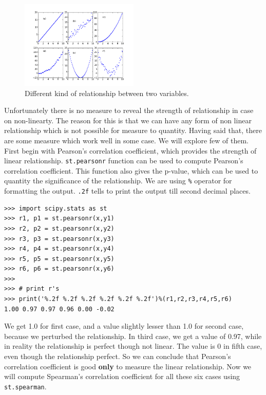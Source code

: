 \documentclass[10pt]{book}
\begin{document}
{\beforefig
\begin{figure}[h!]
  \centering
    \includegraphics[width=0.5\textwidth]{images/corr.png}
  \caption{Different kind of relationship between two variables.}
   \label{fig:corr}
\end{figure}
\afterfig

Unfortunately there is no measure to reveal the strength of relationship in case on non-linearty.  The reason for this is that we can have any form of non linear relationship which is not possible for measure to quantity. Having said that, there are some measure which work well in some case. We will explore few of them. First begin with Pearson's correlation coefficient, which provides the strength of linear relationship. \verb"st.pearsonr" function can be used to compute Pearson's correlation coefficient. This function also gives the p-value, which can be used to quantity the significance of the relationship. We are using \verb"%" 
operator for formatting the output. \verb".2f" tells to print the output till second decimal places. 
\beforeverb \begin{verbatim}
>>> import scipy.stats as st
>>> r1, p1 = st.pearsonr(x,y1)
>>> r2, p2 = st.pearsonr(x,y2)
>>> r3, p3 = st.pearsonr(x,y3)
>>> r4, p4 = st.pearsonr(x,y4)
>>> r5, p5 = st.pearsonr(x,y5)
>>> r6, p6 = st.pearsonr(x,y6)
>>> 
>>> # print r's
>>> print('%.2f %.2f %.2f %.2f %.2f %.2f')%(r1,r2,r3,r4,r5,r6)
1.00 0.97 0.97 0.96 0.00 -0.02
\end{verbatim} \afterverb
We get 1.0 for first case, and a value slightly lesser than 1.0 for second case, because we perturbed the relationship. In third case, we get a value of 0.97, while in reality the relationship is perfect though not linear. The value is 0 in fifth case, even though the relationship perfect. So we can conclude that Pearson's correlation coefficient is good {\bf only} to measure the linear relationship. Now we will compute Spearman's correlation coefficient for all these six cases using \verb"st.spearman".
\beforeverb \begin{verbatim}

\end{verbatim}}
\end{document}
